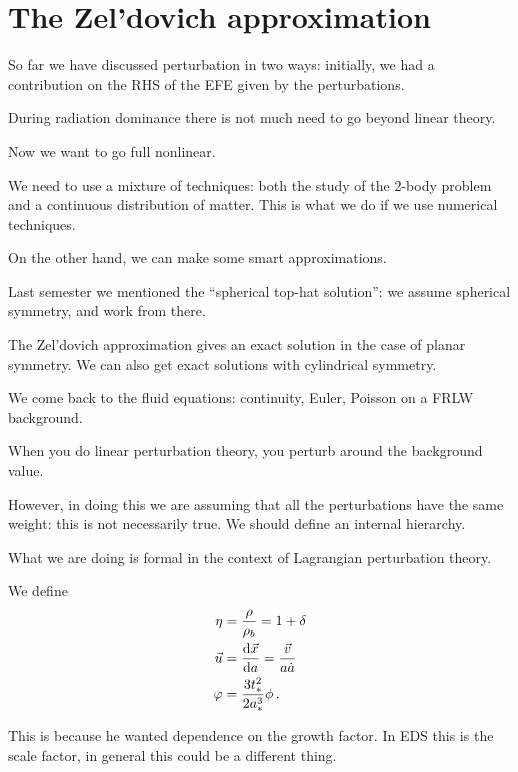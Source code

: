 \documentclass[main.tex]{subfiles}
\begin{document}

\section{The Zel'dovich approximation}

So far we have discussed perturbation in two ways: initially, we had a contribution on the RHS of the EFE given by the perturbations.

During radiation dominance there is not much need to go beyond linear theory. 

Now we want to go full nonlinear.

We need to use a mixture of techniques: both the study of the 2-body problem and a continuous distribution of matter.
This is what we do if we use numerical techniques.

On the other hand, we can make some smart approximations.

Last semester we mentioned the ``spherical top-hat solution'': we assume spherical symmetry, and work from there. 

The Zel'dovich approximation gives an exact solution in the case of planar symmetry.
We can also get exact solutions with cylindrical symmetry. 

We come back to the fluid equations: continuity, Euler, Poisson on a FRLW background. 

When you do linear perturbation theory, you perturb around the background value.

However, in doing this we are assuming that all the perturbations have the same weight: this is not necessarily true. We should define an internal hierarchy. 

What we are doing is formal in the context of Lagrangian perturbation theory. 

We define 
%
\begin{align}
\eta &= \frac{\rho }{ \rho_{b}}  = 1 + \delta  \\
\vec{u} &= \dv{\vec{x}}{a} = \frac{\vec{v}}{a \dot{a} }  \\
\varphi &= \frac{3 t_{*}^2}{2 a_{*}^3} \phi 
\,.
\end{align}

This is because he wanted dependence on the growth factor. In EDS this is the scale factor, in general this could be a different thing.
\end{document}
